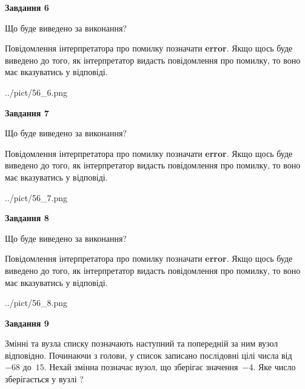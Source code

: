 \documentclass[12pt, ukrainian]{article}
\begin{document}
{\begin {large}
{\begin {center}\textbf{Завдання 6}\end {center}}\par
Що буде виведено за виконання?

Повідомлення інтерпретатора про помилку позначати \textbf{error}.
Якщо щось буде виведено до того, як інтерпретатор видасть повідомлення про помилку, 
то воно має вказуватись у відповіді. \par


\begin{center}
	{../pict/56_6.png}
\end{center}
\newpage

{\begin {center}\textbf{Завдання 7}\end {center}}\par
Що буде виведено за виконання?

Повідомлення інтерпретатора про помилку позначати \textbf{error}.
Якщо щось буде виведено до того, як інтерпретатор видасть повідомлення про помилку, 
то воно має вказуватись у відповіді. \par


\begin{center}
	{../pict/56_7.png}
\end{center}
\newpage

{\begin {center}\textbf{Завдання 8}\end {center}}\par
Що буде виведено за виконання?

Повідомлення інтерпретатора про помилку позначати \textbf{error}.
Якщо щось буде виведено до того, як інтерпретатор видасть повідомлення про помилку, 
то воно має вказуватись у відповіді. \par


\begin{center}
	{../pict/56_8.png}
\end{center}
\newpage

{\begin {center}\textbf{Завдання 9}\end {center}}\par
Змінні  та  вузла списку позначають наступний та попередній за ним вузол відповідно. Починаючи з голови, у список записано послідовні цілі числа від~$-68$ до~$15$. Нехай змінна  позначає вузол, що зберігає значення~$-4$.
Яке число зберігається у вузлі  ?\par
\newpage


\end{large}}
\end{document}
